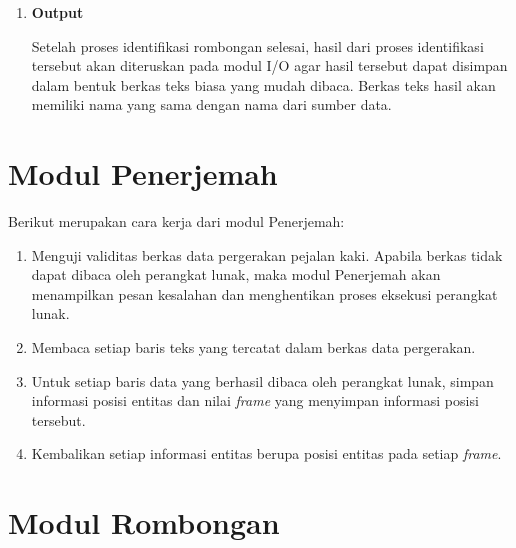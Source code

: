 \begin{enumerate}
    \item \textbf{Output}
    
    Setelah proses identifikasi rombongan selesai, hasil dari proses identifikasi tersebut akan diteruskan pada modul I/O agar hasil tersebut dapat disimpan dalam bentuk berkas teks biasa yang mudah dibaca. Berkas teks hasil akan memiliki nama yang sama dengan nama dari sumber data. 
    
    \iffalse
    
    Sebuah rombongan yang teridentifikasi akan dicatat sebagai satu baris dalam berkas teks yang dihasilkan. Rombongan tersebut akan dicatat dalam bentuk \texttt{<anggota> <frame-mulai> <frame-berakhir>}. Nilai dari \texttt{<anggota>} merupakan nomor identitas dari setiap anggota rombongan yang akan dipisahkan menggunakan koma. Fungsionalitas ini akan diimplementasikan sebagai fungsi \texttt{writeResultToFile}. Fungsionalitas ini akan diimplementasikan menggunakan pustaka standar bawaan C++17.
    
    \fi
\end{enumerate}

\section{Modul Penerjemah}
\label{sec:parser}

Berikut merupakan cara kerja dari modul Penerjemah:

\begin{enumerate}
    \item Menguji validitas berkas data pergerakan pejalan kaki. Apabila berkas tidak dapat dibaca oleh perangkat lunak, maka modul Penerjemah akan menampilkan pesan kesalahan dan menghentikan proses eksekusi perangkat lunak.
    \item Membaca setiap baris teks yang tercatat dalam berkas data pergerakan.
    
    \iffalse 
    
    \cristopher{Kudu jelasin gak sih ko bentuk datanya gimana?} \lionov{gak usah lah, bilang aja pokoknya ini buat nerima input, nanti di ``implementasi'' baru dijelasin setelah ngejelasin datanya kayak apa}
    
    \fi
    
    \item Untuk setiap baris data yang berhasil dibaca oleh perangkat lunak, simpan informasi posisi entitas dan nilai \textit{frame} yang menyimpan informasi posisi tersebut.
    \item Kembalikan setiap informasi entitas berupa posisi entitas pada setiap \textit{frame}.
\end{enumerate}

\section{Modul Rombongan}
\label{sec:rombongan-identifier}